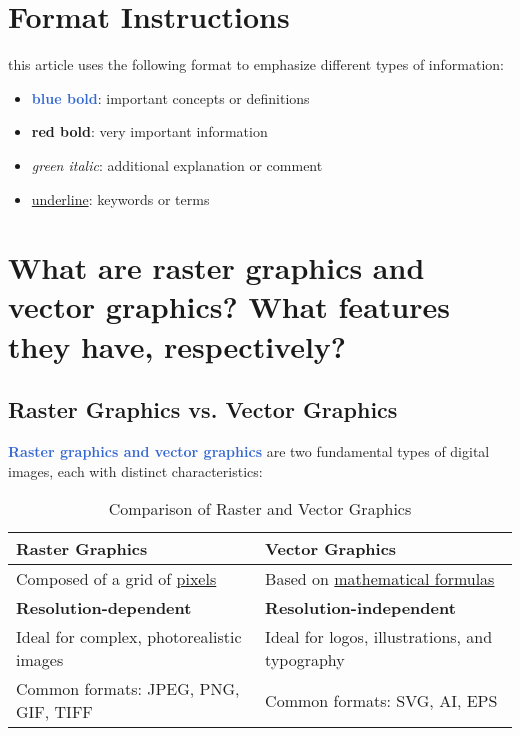 \documentclass[12pt]{article}
\begin{document}


\section*{Format Instructions}
this article uses the following format to emphasize different types of information:
\begin{itemize}
    \item \textcolor{highlight}{\textbf{blue bold}}: important concepts or definitions
    \item \textcolor{important}{\textbf{red bold}}: very important information
    \item \textcolor{note}{\textit{green italic}}: additional explanation or comment
    \item \underline{underline}: keywords or terms
\end{itemize}


\section{What are raster graphics and vector graphics? What features they have, respectively?}\label{sec:1}

\subsection{Raster Graphics vs. Vector Graphics}

\textcolor{highlight}{\textbf{Raster graphics and vector graphics}} are two fundamental types of digital images, each with distinct characteristics:

\begin{table}[h]
\centering
\begin{tabulary}{\textwidth}{|L|L|}
\hline
\textbf{Raster Graphics} & \textbf{Vector Graphics} \\
\hline
Composed of a grid of \underline{pixels} & Based on \underline{mathematical formulas} \\
\textcolor{important}{\textbf{Resolution-dependent}} & \textcolor{important}{\textbf{Resolution-independent}} \\
Ideal for complex, photorealistic images & Ideal for logos, illustrations, and typography \\
Common formats: JPEG, PNG, GIF, TIFF & Common formats: SVG, AI, EPS \\
\hline
\end{tabulary}
\caption{Comparison of Raster and Vector Graphics}
\label{tab:raster-vs-vector}
\end{table}
\end{document}

